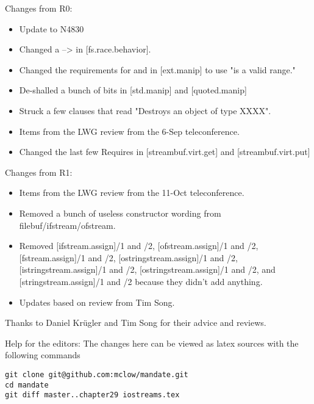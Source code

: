 Changes from R0:
\begin{itemize}
\item{Update to N4830}
\item{Changed a \requires --> \expects in [fs.race.behavior].}
\item{Changed the requirements for  and  in [ext.manip] to use "is a valid range."}
\item{De-shalled a bunch of bits in [std.manip] and [quoted.manip]}
\item{Struck a few clauses that read "Destroys an object of type XXXX".}
\item{Items from the LWG review from the 6-Sep teleconference.}
\item{Changed the last few Requires in [streambuf.virt.get] and [streambuf.virt.put]}
\end{itemize}

Changes from R1:
\begin{itemize}
\item{Items from the LWG review from the 11-Oct teleconference.}
\item{Removed a bunch of useless constructor wording from filebuf/ifstream/ofstream.}
\item{Removed [ifstream.assign]/1 and /2, [ofstream.assign]/1 and /2, [fstream.assign]/1 and /2, [ostringstream.assign]/1 and /2,  [istringstream.assign]/1 and /2, [ostringstream.assign]/1 and /2, and [stringstream.assign]/1 and /2 because they didn't add anything.}
\item{Updates based on review from Tim Song.}
\end{itemize}

Thanks to Daniel Krügler and Tim Song for their advice and reviews.

\vfill
Help for the editors: The changes here can be viewed as latex sources with the following commands
\begin{verbatim}
git clone git@github.com:mclow/mandate.git
cd mandate
git diff master..chapter29 iostreams.tex
\end{verbatim}

